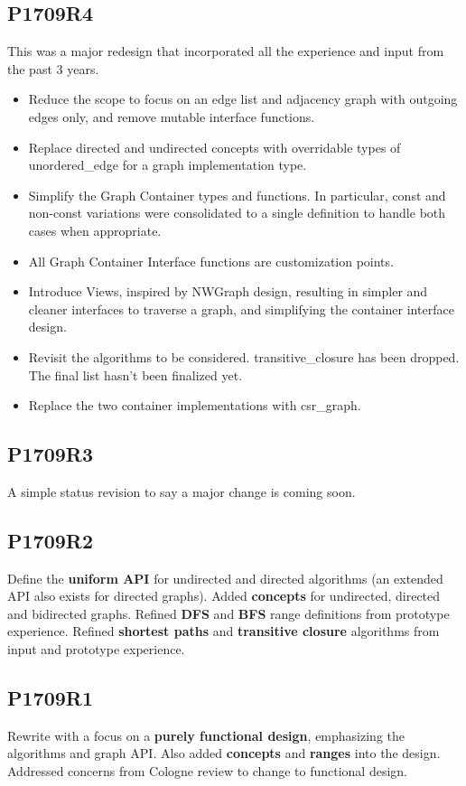 \documentclass[10pt,onecolumn]{article}
\begin{document}
\subsection*{P1709R4}
This was a major redesign that incorporated all the experience and input from the past 3 years.
\begin{itemize}
\item Reduce the scope to focus on an edge list and adjacency graph with outgoing edges only, and remove mutable interface functions. 
\item Replace directed and undirected concepts with overridable types of unordered\_edge for a graph implementation type.
\item Simplify the Graph Container types and functions. In particular, const and non-const variations were consolidated to a single definition to handle both cases 
when appropriate.
\item All Graph Container Interface functions are customization points.
\item Introduce Views, inspired by NWGraph design, resulting in simpler and cleaner interfaces to traverse a graph, and simplifying the container interface design.
\item Revisit the algorithms to be considered. transitive\_closure has been dropped. The final list hasn't been finalized yet.
\item Replace the two container implementations with csr\_graph.
\end{itemize}

\subsection*{P1709R3}
A simple status revision to say a major change is coming soon.

\subsection*{P1709R2}
Define the \textbf{uniform API} for undirected and directed algorithms (an extended API also exists for directed graphs). Added \textbf{concepts} for undirected, directed and bidirected graphs. Refined \textbf{DFS} and \textbf{BFS} range definitions from prototype experience. Refined \textbf{shortest paths} and \textbf{transitive closure} algorithms from input and prototype experience.

\subsection*{P1709R1}
Rewrite with a focus on a \textbf{purely functional design}, emphasizing the algorithms and graph API. Also added \textbf{concepts} and \textbf{ranges} into the design. Addressed concerns from Cologne review to change to functional design.
\end{document}
